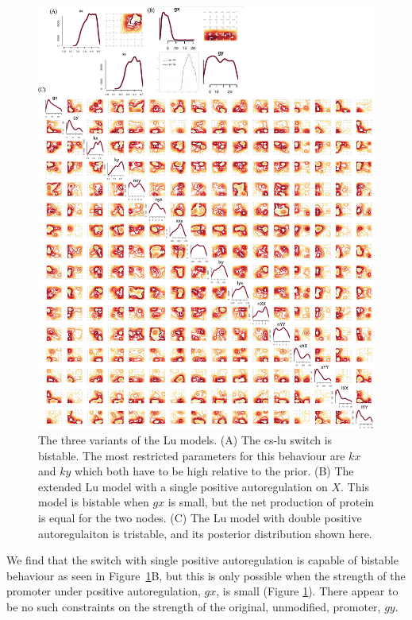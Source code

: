 \begin{figure}[p]
\centerfloat
\includegraphics[width=1.3\textwidth]{../../chapters/chapterStabilityFinder/images/lu_paper_post_w.png}
\caption[Posterior distributions of the Lu switches]{ \label{fig:fig3}The three variants of the Lu models. (A) The \acrshort{cs-lu} switch is bistable. The most restricted parameters for this behaviour are $kx$ and $ky$ which both have to be high relative to the prior. (B) The extended Lu model with a single positive autoregulation on $X$. This model is bistable when $gx$ is small, but the net production of protein is equal for the two nodes. (C) The Lu model with double positive autoregulaiton is tristable, and its posterior distribution shown here. }

\end{figure}
\clearpage

We find that the switch with single positive autoregulation is capable of bistable behaviour as seen in Figure~\ref{fig:fig3}B, but this is only possible when the strength of the promoter under positive autoregulation, $gx$, is small (Figure \ref{fig:fig3}). There appear to be no such constraints on the strength of the original, unmodified, promoter, $gy$.  

